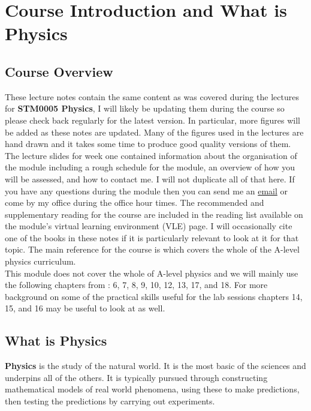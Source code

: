 \chapter{Course Introduction and What is Physics}

\section{Course Overview}
These lecture notes contain the same content as was covered during the lectures for \textbf{STM0005 Physics}, I will likely be updating them during the course so please check back regularly for the latest version. In particular, more figures will be added as these notes are updated. Many of the figures used in the lectures are hand drawn and it takes some time to produce good quality versions of them.\\


The lecture slides for week one contained information about the organisation of the module including a rough schedule for the module, an overview of how you will be assessed, and  how to contact me. I will not duplicate all of that here. If you have any questions during the module then you can send me an \href{mailto:rossc@edgehill.ac.uk}{email} or come by my office during the office hour times. The recommended and supplementary reading for the course are included in the reading list available on the module's virtual learning environment (VLE) page. I will occasionally cite one of the books in these notes if it is particularly relevant to look at it for that topic. The main reference for the course is \citep{breithaupt2016aqa} which covers the whole of the A-level physics curriculum.\\

This module does not cover the whole of A-level physics and we will mainly use the following chapters from \citep{breithaupt2016aqa}: 6, 7, 8, 9, 10, 12, 13, 17, and 18. For more background on some of the practical skills useful for the lab sessions chapters 14, 15, and 16 may be useful to look at as well.

\section{What is Physics}
\textbf{Physics} is the study of the natural world. It is the most basic of the sciences and underpins all of the others. It is typically pursued through constructing mathematical models of real world phenomena, using these to make predictions, then testing the predictions by carrying out experiments.\\

